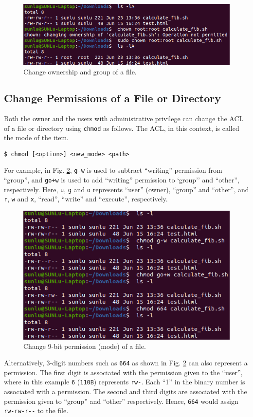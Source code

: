 \begin{figure}[htbp]
	\centering
	\includegraphics[width=350pt]{chapters/part-1/figures/chownexp.png}
	\caption{Change ownership and group of a file.} \label{ch:fm:fig:chownexp}
\end{figure}

\subsection{Change Permissions of a File or Directory}

Both the owner and the users with administrative privilege can change the ACL of a file or directory using \verb|chmod| as follows. The ACL, in this context, is called the mode of the item.
\begin{lstlisting}
$ chmod [<option>] <new_mode> <path>
\end{lstlisting}
For example, in Fig. \ref{ch:fm:fig:chmodexp}, \verb|g-w| is used to subtract ``writing'' permission from ``group'', and \verb|go+w| is used to add ``writing'' permission to `group'' and ``other'', respectively. Here, \verb|u|, \verb|g| and \verb|o| represents ``user'' (owner), ``group'' and ``other'', and \verb|r|, \verb|w| and \verb|x|, ``read'', ``write'' and ``execute'', respectively.
\begin{figure}[htbp]
	\centering
	\includegraphics[width=350pt]{chapters/part-1/figures/chmodexp.png}
	\caption{Change 9-bit permission (mode) of a file.} \label{ch:fm:fig:chmodexp}
\end{figure}
Alternatively, 3-digit numbers such as \verb|664| as shown in Fig. \ref{ch:fm:fig:chmodexp} can also represent a permission. The first digit is associated with the permission given to the ``user'', where in this example \verb|6| (\verb|110B|) represents \verb|rw-|. Each ``1'' in the binary number is associated with a permission. The second and third digits are associated with the permission given to ``group'' and ``other'' respectively. Hence, \verb|664| would assign \verb|rw-rw-r--| to the file.

